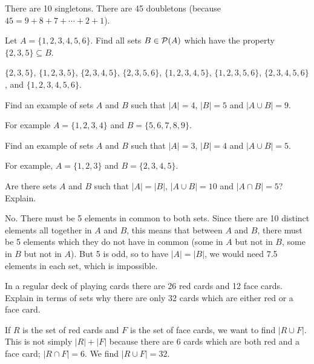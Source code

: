 \begin{questions}
  \begin{answer}
      There are 10 singletons.  There are 45 doubletons (because $45 = 9+8+7+\cdots+2+1$).
  \end{answer}


  
  
\question Let $A = \{1,2,3,4,5,6\}$.  Find all sets $B \in \mathcal P(A)$ which have the property $\{2,3,5\} \subseteq B$.

  \begin{answer}
      $\{2,3,5\}$, $\{1,2,3,5\}$, $\{2,3,4,5\}$, $\{2,3,5,6\}$, $\{1,2,3,4,5\}$, $\{1,2,3,5,6\}$, $\{2,3,4,5,6\}$, and $\{1,2,3,4,5,6\}$.
  \end{answer}


  
\question Find an example of sets $A$ and $B$ such that $|A| = 4$, $|B| = 5$ and $|A \cup B| = 9$.  

  \begin{answer}
   For example $A = \{1,2,3,4\}$ and $B = \{5,6,7,8,9\}$.
  \end{answer}

  
  

\question Find an example of sets $A$ and $B$ such that $|A| = 3$, $|B| = 4$ and $|A \cup B| = 5$.

  \begin{answer}
    For example, $A = \{1,2,3\}$ and $B = \{2,3,4,5\}$.
  \end{answer}

\question Are there sets $A$ and $B$ such that $|A| = |B|$, $|A\cup B| = 10$ and $|A\cap B| = 5$?  Explain.

	\begin{answer}
	 No.  There must be 5 elements in common to both sets.  Since there are 10 distinct elements all together in $A$ and $B$, this means that between $A$ and $B$, there must be 5 elements which they do not have in common (some in $A$ but not in $B$, some in $B$ but not in $A$).  But 5 is odd, so to have $|A| = |B|$, we would need 7.5 elements in each set, which is impossible.
	\end{answer}

\question In a regular deck of playing cards there are 26 red cards and 12 face cards.  Explain in terms of sets why there are only 32 cards which are either red or a face card.

  \begin{answer}
      If $R$ is the set of red cards and $F$ is the set of face cards, we want to find $|R \cup F|$.  This is not simply $|R| + |F|$ because there are 6 cards which are both red and a face card; $|R \cap F| = 6$.  We find $|R \cup F| = 32$.
  \end{answer}


\end{questions}
